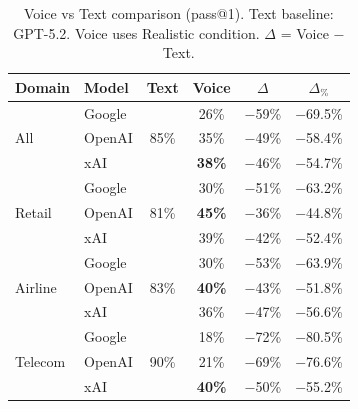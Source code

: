 \begin{table}[h]
\caption{Voice vs Text comparison (pass@1). Text baseline: GPT-5.2. Voice uses Realistic condition. $\Delta$ = Voice $-$ Text.}
\label{tab:voice-vs-text}
\centering
\begin{small}
\begin{tabular}{@{}llcccc@{}}
\toprule
\textbf{Domain} & \textbf{Model} & \textbf{Text} & \textbf{Voice} & \textbf{$\Delta$} & \textbf{$\Delta_{\%}$} \\
\midrule
\multirow{3}{*}{All} & Google & \multirow{3}{*}{85\%} & 26\% & $-$59\% & $-$69.5\% \\
 & OpenAI &  & 35\% & $-$49\% & $-$58.4\% \\
 & xAI &  & \textbf{38\%} & $-$46\% & $-$54.7\% \\
\midrule
\multirow{3}{*}{Retail} & Google & \multirow{3}{*}{81\%} & 30\% & $-$51\% & $-$63.2\% \\
 & OpenAI &  & \textbf{45\%} & $-$36\% & $-$44.8\% \\
 & xAI &  & 39\% & $-$42\% & $-$52.4\% \\
\midrule
\multirow{3}{*}{Airline} & Google & \multirow{3}{*}{83\%} & 30\% & $-$53\% & $-$63.9\% \\
 & OpenAI &  & \textbf{40\%} & $-$43\% & $-$51.8\% \\
 & xAI &  & 36\% & $-$47\% & $-$56.6\% \\
\midrule
\multirow{3}{*}{Telecom} & Google & \multirow{3}{*}{90\%} & 18\% & $-$72\% & $-$80.5\% \\
 & OpenAI &  & 21\% & $-$69\% & $-$76.6\% \\
 & xAI &  & \textbf{40\%} & $-$50\% & $-$55.2\% \\
\bottomrule
\end{tabular}
\end{small}
\end{table}
